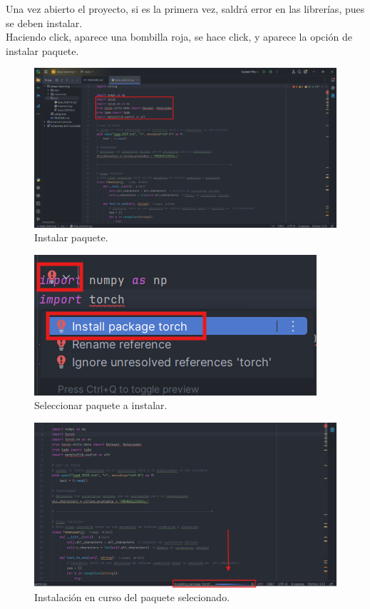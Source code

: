 \documentclass{article}
\begin{document}
Una vez abierto el proyecto, si es la primera vez, saldrá error en las librerías, pues se deben instalar. \\

Haciendo click, aparece una bombilla roja, se hace click, y aparece la opción de instalar paquete.

\begin{figure}[H]
    \centering
    \includegraphics[scale=0.4]{py10.png}
    \caption{Instalar paquete.}
\end{figure}

\begin{figure}[H]
    \centering
    \includegraphics[scale=0.95]{py11.png}
    \caption{Seleccionar paquete a instalar.}
\end{figure}

\begin{figure}[H]
    \centering
    \includegraphics[scale=0.45]{py12.png}
    \caption{Instalación en curso del paquete selecionado.}
\end{figure}
\end{document}
